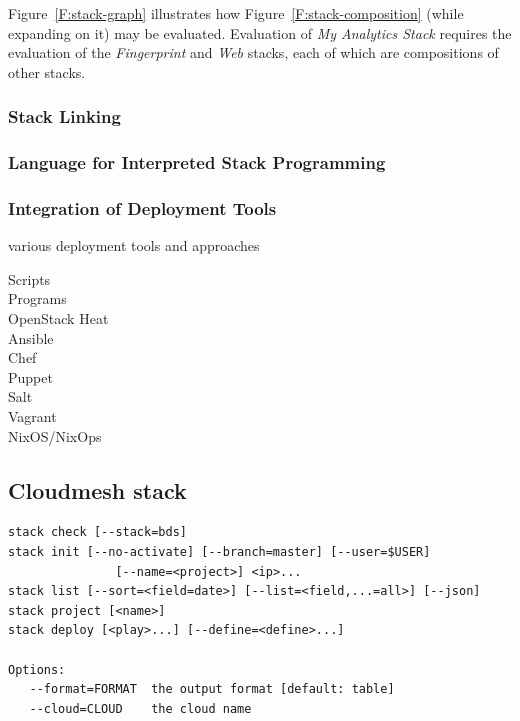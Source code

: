 Figure~\ref{F:stack-graph} illustrates how Figure~\ref{F:stack-composition} (while expanding on it) may be evaluated.
Evaluation of {\it My Analytics Stack} requires the evaluation of the
{\it Fingerprint} and {\it Web} stacks, each of which are compositions of other stacks.


\subsubsection{Stack Linking} \label{S:stack-linking}

\subsubsection{Language for Interpreted Stack Programming} \label{S:stack-lisp}


\subsubsection{Integration of Deployment Tools}

various deployment tools and approaches

\begin{description}
\item[Scripts]
\item[Programs]
\item[OpenStack Heat]
\item[Ansible]
\item[Chef]
\item[Puppet]
\item[Salt]
\item[Vagrant]
\item[NixOS/NixOps]
\end{description}

\subsection{Cloudmesh stack}

\begin{Verbatim}[fontfamily=helvetica]
stack check [--stack=bds]
stack init [--no-activate] [--branch=master] [--user=$USER] 
               [--name=<project>] <ip>...
stack list [--sort=<field=date>] [--list=<field,...=all>] [--json]
stack project [<name>]
stack deploy [<play>...] [--define=<define>...]

Options:
   --format=FORMAT  the output format [default: table]
   --cloud=CLOUD    the cloud name
\end{Verbatim}


